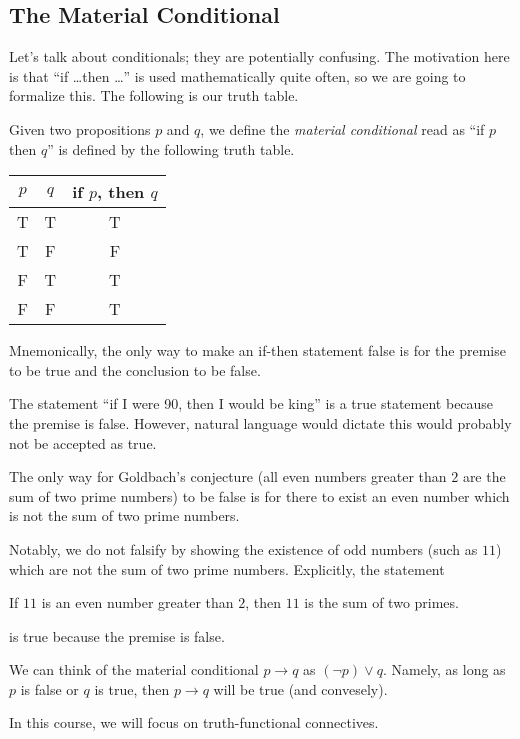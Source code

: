 \subsection{The Material Conditional}
Let's talk about conditionals; they are potentially confusing. The motivation here is that ``if \ldots then \ldots'' is used mathematically quite often, so we are going to formalize this. The following is our truth table.
\begin{definition}
	Given two propositions $p$ and $q$, we define the \textit{material conditional} read as ``if $p$ then $q$'' is defined by the following truth table.
	\begin{center}
		\begin{tabular}{cc|c}
			$p$ & $q$ & if $p$, then $q$ \\\hline
			T & T & T \\
			T & F & F \\
			F & T & T \\
			F & F & T
		\end{tabular}
	\end{center}
\end{definition}
Mnemonically, the only way to make an if-then statement false is for the premise to be true and the conclusion to be false.
\begin{warn}
	The statement ``if I were 90, then I would be king'' is a true statement because the premise is false. However, natural language would dictate this would probably not be accepted as true.
\end{warn}
\begin{example}
	The only way for Goldbach's conjecture (all even numbers greater than $2$ are the sum of two prime numbers) to be false is for there to exist an even number which is not the sum of two prime numbers.
	
	Notably, we do not falsify by showing the existence of odd numbers (such as $11$) which are not the sum of two prime numbers. Explicitly, the statement
	\begin{center}
		If $11$ is an even number greater than $2$, then $11$ is the sum of two primes.
	\end{center}
	is true because the premise is false.
\end{example}
\begin{remark}
	We can think of the material conditional $p\to q$ as $(\lnot p)\lor q$. Namely, as long as $p$ is false or $q$ is true, then $p\to q$ will be true (and convesely).
\end{remark}
In this course, we will focus on truth-functional connectives.

